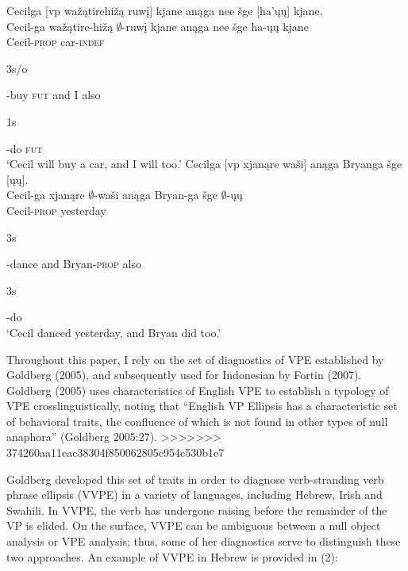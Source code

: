 \documentclass[output=paper]{LSP/langsci}
\begin{document}
\begin{exe}
\ex
\begin{xlist}
\ex
\glll Cecilga {\textsc [vp} wa\v{z}\k{a}tirehi\v{z}\k{a} ruw\k{i}{\textsc ]} kjane an\k{a}ga nee \v{s}ge {\textsc [}ha'\k{u}\k{u}{\textsc ]} kjane.\\
Cecil-ga {} wa\v{z}\k{a}tire-hi\v{z}\k{a} $\emptyset$-ruw\k{i} kjane an\k{a}ga nee \v{s}ge ha-\k{u}\k{u} kjane\\
Cecil-\textsc{prop} {} car-\textsc{indef} \begin{sc}3s/o\end{sc}-buy \textsc{fut} and I also \begin{sc}1s\end{sc}-do \textsc{fut}\\
\trans `Cecil will buy a car, and I will too.' 
\ex
\glll Cecilga {\textsc [vp} xjan\k{a}re wa\v{s}i{\textsc ]} an\k{a}ga Bryanga \v{s}ge {\textsc [}\k{u}\k{u}{\textsc ]}.\\
Cecil-ga {} xjan\k{a}re $\emptyset$-wa\v{s}i an\k{a}ga Bryan-ga \v{s}ge $\emptyset$-\k{u}\k{u}\\
Cecil-\textsc{prop} {} yesterday \begin{sc}3s\end{sc}-dance and Bryan-\textsc{prop} also \begin{sc}3s\end{sc}-do\\
\trans `Cecil danced yesterday, and Bryan did too.'
\end{xlist}
\end{exe}


Throughout this paper, I rely on the set of diagnostics of VPE established by Goldberg (2005), and subsequently used for Indonesian by Fortin (2007). Goldberg (2005) uses characteristics of English VPE to establish a typology of VPE crosslinguistically, noting that ``English VP Ellipsis has a characteristic set of behavioral traits, the confluence of which is not found in other types of null anaphora'' (Goldberg 2005:27). 
>>>>>>> 374260aa11eac38304f850062805c954c530b1e7

Goldberg developed this set of traits in order to diagnose verb-stranding verb phrase ellipsis (VVPE) in a variety of languages, including Hebrew, Irish and Swahili. In VVPE, the verb has undergone raising before the remainder of the VP is elided. On the surface, VVPE can be ambiguous between a null object analysis or VPE analysis; thus, some of her diagnostics serve to distinguish these two approaches. An example of VVPE in Hebrew is provided in (2):
\end{document}
